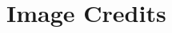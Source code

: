 

\label{m0185_Ch_End_Matter_Wave_Reflection_and_Transmission} %

\onecolumn
\section*{Image Credits}

